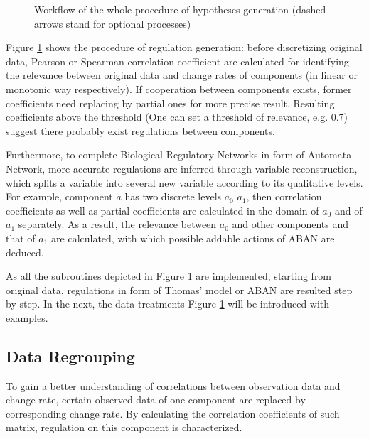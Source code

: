 \begin{figure}[ht]

\caption[Workflow of model inference via partial correlation]{Workflow of the whole procedure of hypotheses generation (dashed arrows stand for optional processes)}\label{plan}
\end{figure}
Figure \ref{plan} shows the procedure of regulation generation: before discretizing original data, Pearson or Spearman correlation coefficient \cite{samaga2009logic,hauke2011comparison} are calculated for identifying the relevance between original data and change rates of components (in linear or monotonic way respectively). If cooperation between components exists, former coefficients need replacing by partial ones \cite{de2004discovery} for more precise result.
Resulting coefficients above the threshold (One can set a threshold of relevance, e.g. 0.7) suggest there probably exist regulations between components.

Furthermore, to complete Biological Regulatory Networks in form of Automata Network, more accurate regulations are inferred through variable reconstruction, which splits a variable into several new variable according to its qualitative levels.
For example, component $a$ has two discrete levels $a_0$ $a_1$, then correlation coefficients as well as partial coefficients are calculated in the domain of $a_0$ and of $a_1$ separately.
As a result, the relevance between $a_0$ and other components and that of $a_1$ are calculated, with which possible addable actions of ABAN are deduced.

As all the subroutines depicted in Figure \ref{plan} are implemented, starting from original data, regulations in form of Thomas' model or ABAN are resulted step by step. In the next, the data treatments Figure \ref{plan} will be introduced with examples.

\subsection{Data Regrouping}
To gain a better understanding of correlations between observation data and change rate, certain observed data of one component are replaced by corresponding change rate. By calculating the correlation coefficients of such matrix, regulation on this component is characterized.

